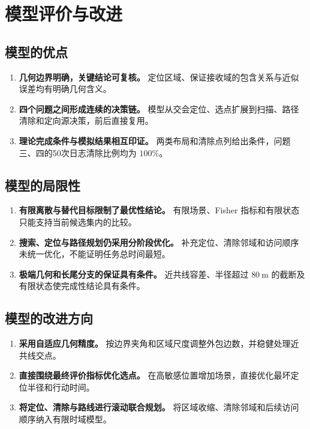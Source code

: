 \section{模型评价与改进}

\subsection{模型的优点}

\begin{enumerate}
  \item \textbf{几何边界明确，关键结论可复核。}
  定位区域、保证接收域的包含关系与近似误差均有明确几何含义。

  \item \textbf{四个问题之间形成连续的决策链。}
  模型从交会定位、选点扩展到扫描、路径清除和定向源决策，前后直接复用。

  \item \textbf{理论完成条件与模拟结果相互印证。}
  两类布局和清除点列给出条件，问题三、四的50次日志清除比例均为 $100\%$。
\end{enumerate}

\subsection{模型的局限性}

\begin{enumerate}
  \item \textbf{有限离散与替代目标限制了最优性结论。}
  有限场景、Fisher 指标和有限状态只能支持当前候选集内的比较。

  \item \textbf{搜索、定位与路径规划仍采用分阶段优化。}
  补充定位、清除邻域和访问顺序未统一优化，不能证明任务总时间最短。

  \item \textbf{极端几何和长尾分支的保证具有条件。}
  近共线容差、半径超过 $80\ \mathrm m$ 的截断及有限状态使完成性结论具有条件。
\end{enumerate}

\subsection{模型的改进方向}

\begin{enumerate}
  \item \textbf{采用自适应几何精度。}
  按边界夹角和区域尺度调整外包边数，并稳健处理近共线交点。

  \item \textbf{直接围绕最终评价指标优化选点。}
  在高敏感位置增加场景，直接优化最坏定位半径和行动时间。

  \item \textbf{将定位、清除与路线进行滚动联合规划。}
  将区域收缩、清除邻域和后续访问顺序纳入有限时域模型。
\end{enumerate}

